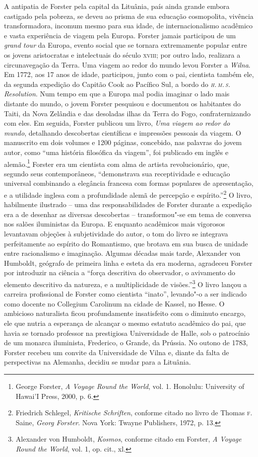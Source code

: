 A antipatia de Forster pela capital da Lituânia, país ainda grande 
embora castigado pela pobreza, se deveu ao prisma de sua educação
cosmopolita, vivência transformadora, incomum mesmo para sua idade, de
internacionalismo acadêmico e vasta experiência de viagem pela Europa.
Forster jamais participou de um \textit{grand tour} da Europa, evento
social que se tornara extremamente popular entre os jovens aristocratas
e intelectuais do século \textsc{xviii}; por outro lado, realizara a circunavegação
da Terra. Uma viagem ao redor do mundo levou Forster a \textit{Wilna}. Em 1772,
aos 17 anos de idade, participou, junto com o pai, cientista
também ele, da segunda expedição do Capitão Cook ao Pacífico Sul, a
bordo do \textit{\textsc{h.\,m.\,s.}\,Resolution}. Num tempo em que a Europa mal podia
imaginar o lado mais distante do mundo, o jovem Forster pesquisou e
documentou os habitantes do Taiti, da Nova Zelândia e das desoladas
ilhas da Terra do Fogo, confraternizando com eles. Em seguida, Forster
publicou um livro, \textit{Uma viagem ao redor do mundo}, detalhando
descobertas científicas e impressões pessoais da viagem. O manuscrito em
dois volumes e 1200 páginas, concebido, nas palavras do jovem autor,
como ``uma história filosófica da viagem'', foi publicado em inglês e
alemão.\footnote{George Forster, \textit{A Voyage Round the World}, vol. 1. Honolulu: University of Hawai'I Press, 2000, p. 6.}
Forster era um cientista com alma de artista revolucionário, que,
segundo seus contemporâneos, ``demonstrava sua receptividade e educação
universal combinando a elegância francesa com formas populares de
apresentação, e a utilidade inglesa com a profundidade alemã de
percepção e espírito.''\footnote{Friedrich Schlegel, \textit{Kritische Schriften}, conforme citado no livro de Thomas \textsc{f}.\,Saine, \textit{Georg Forster}. Nova York: Twayne Publishers, 1972, p. 13.} O livro, habilmente ilustrado -- uma das responsabilidades de Forster durante a expedição era
a de desenhar as diversas descobertas -- transformou"-se em tema de
conversa nos salões iluministas da Europa. E enquanto acadêmicos mais
vigorosos levantavam objeções à subjetividade do autor, o tom do livro
se integrava perfeitamente ao espírito do Romantismo, que brotava em sua
busca de unidade entre racionalismo e imaginação. Algumas décadas mais
tarde, Alexander von Humboldt, geógrafo de primeira linha e esteta da
era moderna, agradeceu Forster por introduzir na ciência a ``força
descritiva do observador, o avivamento do elemento descritivo da
natureza, e a multiplicidade de visões.''\footnote{Alexander von Humboldt, \textit{Kosmos}, conforme citado em Forster, \textit{A Voyage Round the World}, vol. 1, op. cit., xl.}
O livro lançou a carreira profissional de Forster como cientista
``inato'', levando"-o a ser indicado como docente no Collegium Carolinum
na cidade de Kassel, no Hesse. O ambicioso naturalista ficou
profundamente insatisfeito com o diminuto encargo, ele que nutria a
esperança de alcançar o mesmo estatuto acadêmico do pai, que havia se
tornado professor na prestigiosa Universidade de Halle, sob o patrocínio
de um monarca iluminista, Frederico, o Grande, da Prússia. No outono de
1783, Forster recebeu um convite da Universidade de Vilna e, diante da
falta de perspectivas na Alemanha, decidiu se mudar para a Lituânia.

